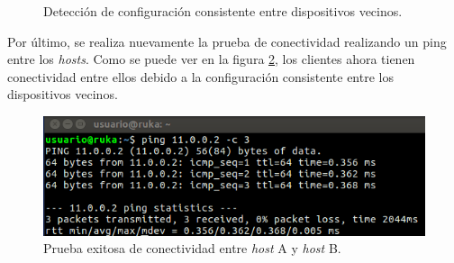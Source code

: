      \begin{figure}[H]
        \centering
        \caption{Detección de configuración consistente entre dispositivos vecinos.}
        \label{fig:test9_3}
      \end{figure}

      Por último, se realiza nuevamente la prueba de conectividad realizando un ping entre los \textit{hosts}. Como se puede ver en la figura \ref{fig:test9_4}, los clientes ahora tienen conectividad entre ellos debido a la configuración consistente entre los dispositivos vecinos.

      \begin{figure}[H]
        \centering
        \includegraphics[scale=0.7]{Figures/test9_4.png}
        \caption{Prueba exitosa de conectividad entre \textit{host} A y \textit{host} B.}
        \label{fig:test9_4}
      \end{figure}
